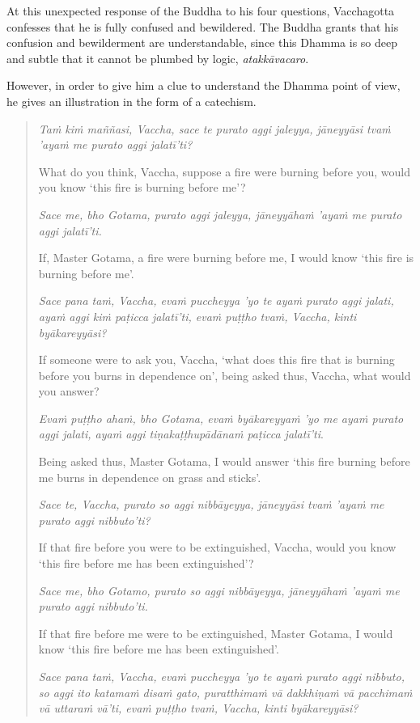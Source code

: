 At this unexpected response of the Buddha to his four questions, Vacchagotta confesses that he is fully confused and bewildered. The Buddha grants that his confusion and bewilderment are understandable, since this Dhamma is so deep and subtle that it cannot be plumbed by logic, \emph{atakkāvacaro}.

However, in order to give him a clue to understand the Dhamma point of view, he gives an illustration in the form of a catechism.

\begin{quote}
\emph{Taṁ kiṁ maññasi, Vaccha, sace te purato aggi jaleyya, jāneyyāsi tvaṁ 'ayaṁ me purato aggi jalatī'ti?}

What do you think, Vaccha, suppose a fire were burning before you, would you know `this fire is burning before me'?

\emph{Sace me, bho Gotama, purato aggi jaleyya, jāneyyāhaṁ 'ayaṁ me purato aggi jalatī'ti.}

If, Master Gotama, a fire were burning before me, I would know `this fire is burning before me'.

\emph{Sace pana taṁ, Vaccha, evaṁ puccheyya 'yo te ayaṁ purato aggi jalati, ayaṁ aggi kiṁ paṭicca jalatī'ti, evaṁ puṭṭho tvaṁ, Vaccha, kinti byākareyyāsi?}

If someone were to ask you, Vaccha, `what does this fire that is burning before you burns in dependence on', being asked thus, Vaccha, what would you answer?

\emph{Evaṁ puṭṭho ahaṁ, bho Gotama, evaṁ byākareyyaṁ 'yo me ayaṁ purato aggi jalati, ayaṁ aggi tiṇakaṭṭhupādānaṁ paṭicca jalatī'ti}.

Being asked thus, Master Gotama, I would answer `this fire burning before me burns in dependence on grass and sticks'.

\emph{Sace te, Vaccha, purato so aggi nibbāyeyya, jāneyyāsi tvaṁ 'ayaṁ me purato aggi nibbuto'ti?}

If that fire before you were to be extinguished, Vaccha, would you know `this fire before me has been extinguished'?

\emph{Sace me, bho Gotamo, purato so aggi nibbāyeyya, jāneyyāhaṁ 'ayaṁ me purato aggi nibbuto'ti.}

If that fire before me were to be extinguished, Master Gotama, I would know `this fire before me has been extinguished'.

\emph{Sace pana taṁ, Vaccha, evaṁ puccheyya 'yo te ayaṁ purato aggi nibbuto, so aggi ito katamaṁ disaṁ gato, puratthimaṁ vā dakkhiṇaṁ vā pacchimaṁ vā uttaraṁ vā'ti, evaṁ puṭṭho tvaṁ, Vaccha, kinti byākareyyāsi?}


\end{quote}
